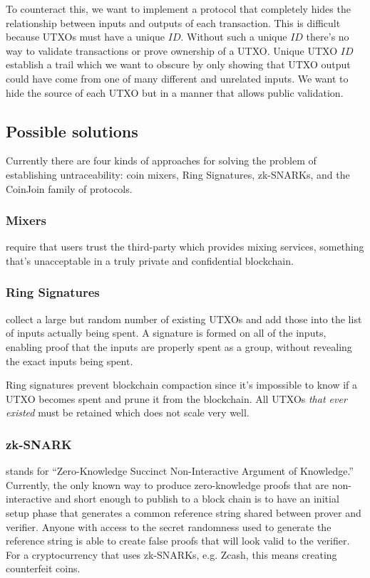 \documentclass[a4paper, 10pt, conference]{ieeeconf}
\begin{document}
To counteract this, we want to implement a protocol that completely hides the relationship between inputs and outputs of each transaction. This is difficult because UTXOs must have a unique $ID$. Without such a unique $ID$ there's no way to validate transactions or prove ownership of a UTXO. Unique UTXO $ID$ establish a trail which we want to obscure by only showing that UTXO output could have come from one of many different and unrelated inputs. We want to hide the source of each UTXO but in a manner that allows public validation.

\subsection{Possible solutions}
Currently there are four kinds of approaches for solving the problem of establishing untraceability: coin mixers, Ring Signatures, zk-SNARKs, and the CoinJoin family of protocols.

\subsubsection{Mixers} require that users trust the third-party which provides mixing services, something that's unacceptable in a truly private and confidential blockchain.

\subsubsection{Ring Signatures} collect a large but random number of existing UTXOs and add those into the list of inputs actually being spent. A signature is formed on all of the inputs, enabling proof that the inputs are properly spent as a group, without revealing the exact inputs being spent. 

Ring signatures prevent blockchain compaction since it's impossible to know if a UTXO becomes spent and prune it from the blockchain. All UTXOs \textit{that ever existed} must be retained which does not scale very well.

\subsubsection{zk-SNARK} stands for ``Zero-Knowledge Succinct Non-Interactive Argument of Knowledge.'' Currently, the only known way to produce zero-knowledge proofs that are non-interactive and short enough to publish to a block chain is to have an initial setup phase that generates a common reference string shared between prover and verifier. Anyone with access to the secret randomness used to generate the reference string is able to create false proofs that will look valid to the verifier. For a cryptocurrency that uses zk-SNARKs, e.g. Zcash, this means creating counterfeit coins. 
\end{document}
